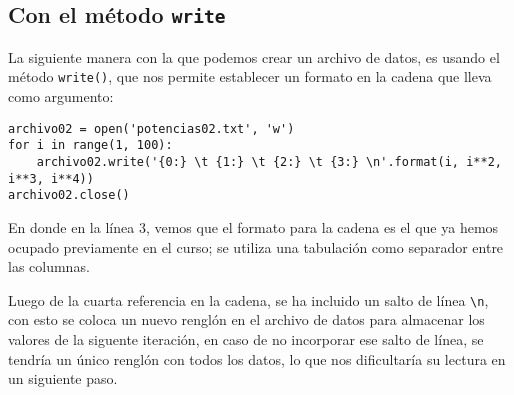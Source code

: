 \documentclass[12pt]{article}
\begin{document}
\subsection{Con el método \texttt{write}}
La siguiente manera con la que podemos crear un archivo de datos, es usando el método \texttt{write()}, que nos permite establecer un formato en la cadena que lleva como argumento:
\begin{verbatim}
archivo02 = open('potencias02.txt', 'w')
for i in range(1, 100):
    archivo02.write('{0:} \t {1:} \t {2:} \t {3:} \n'.format(i, i**2, i**3, i**4))
archivo02.close()
\end{verbatim}
En donde en la línea $3$, vemos que el formato para la cadena es el que ya hemos ocupado previamente en el curso; se utiliza una tabulación como separador entre las columnas.
\par
Luego de la cuarta referencia en la cadena, se ha incluido un salto de línea \texttt{\textbackslash n}, con esto se coloca un nuevo renglón en el archivo de datos para almacenar los valores de la siguente iteración, en caso de no incorporar ese salto de línea, se tendría un único renglón con todos los datos, lo que nos dificultaría su lectura en un siguiente paso.
\end{document}
